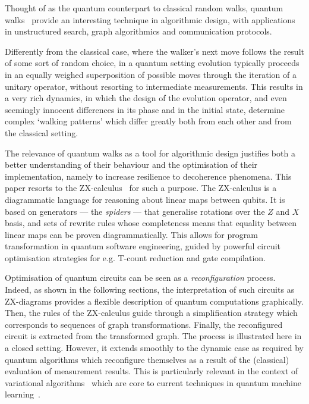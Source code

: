 Thought of as the quantum counterpart to classical random walks, quantum walks~\cite{QW-overview} provide an interesting technique in algorithmic design, 
with  applications in unstructured search, graph algorithmics and communication protocols.

Differently from the classical case, where the  walker's next move follows the result of some sort of random choice, in a quantum setting evolution typically 
proceeds in an equally weighed superposition of possible moves through the iteration of a unitary operator, without resorting to intermediate measurements. 
This results in a very rich dynamics, in which the design of the evolution operator, and even seemingly
innocent differences  in its phase  and in the initial state, determine complex `walking patterns'  
which differ greatly both from each other and from the classical setting.

The relevance of quantum walks as a tool for algorithmic design justifies both a better understanding of their behaviour and the optimisation of their implementation, namely to increase resilience to decoherence phenomena. This  paper resorts to the ZX-calculus~\cite{CoeckeD08,ZX-overview,CoeckeHKW22} for such a purpose. The ZX-calculus is a diagrammatic language for reasoning about linear maps between qubits. It is based on generators --- the \emph{spiders} --- that generalise rotations over the $Z$ and $X$ basis, and sets of rewrite rules whose completeness means that  equality between linear maps can be proven diagrammatically. This allows for program transformation in quantum software engineering, guided by powerful  circuit optimisation strategies for e.g. T-count reduction and gate compilation.

Optimisation of quantum circuits can be seen as a \emph{reconfiguration} process. Indeed, as shown in the following sections, the interpretation of such circuits as ZX-diagrams provides a flexible description of quantum computations graphically. Then, the rules of the ZX-calculus guide through a simplification strategy which corresponds to sequences of graph transformations. Finally, the reconfigured  circuit is extracted from the transformed graph. The process is illustrated here in a closed setting. However, it extends smoothly to the dynamic case as required by quantum algorithms which reconfigure themselves as a result of the (classical) evaluation of measurement results.  This is particularly relevant in the context of variational algorithms~\cite{Cer21} which are core to current techniques in quantum machine learning~\cite{Dun16}.




